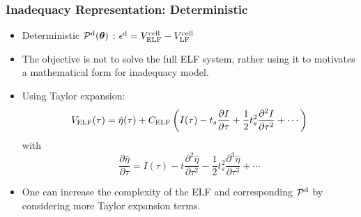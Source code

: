 \documentclass[10pt,xcolor=dvipsnames,compress]{beamer}
\begin{document}
\begin{frame}
\frametitle{Inadequacy Representation: Deterministic}
\vfill

\begin{itemize}
\item Deterministic  $\mathcal{P}^{\rm d}(\boldsymbol{\theta})$ :
$\epsilon^{\rm d}  = 	V^{\rm cell}_{\rm ELF} -  V^{\rm cell}_{\rm LF}$

\item The objective is not to solve the full ELF system, rather using it to motivates a mathematical form for inadequacy model.

\item Using Taylor expansion:
\begin{equation*}
V_{\rm ELF}(\tau) = \hat{\eta}(\tau) + C_{\rm ELF} \left(
I(\tau) - t_s \frac{\partial I}{\partial \tau} + \frac{1}{2} t_s^2 \frac{\partial^2 I}{\partial \tau^2} + \cdots
\right)
\end{equation*}
 with
\begin{equation*}
\frac{\partial{\hat{\eta}}}{\partial\tau} = I(\tau) - t  \frac{\partial^2{\hat{\eta}}}{\partial\tau^2} - \frac{1}{2} t_s^2 \frac{\partial^3{\hat{\eta}}}{\partial\tau^3} + \cdots
\end{equation*}


\item One can increase the complexity of the ELF and corresponding $\mathcal{P}^{\rm d}$ by considering more Taylor expansion terms.

\end{itemize}



\vfill
\end{frame}
\end{document}
